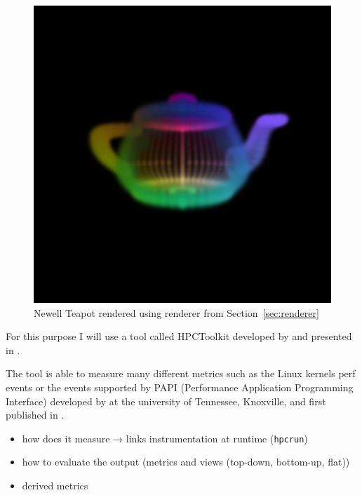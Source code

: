 \documentclass[a4paper, 11pt]{memoir}
\begin{document}
    \begin{figure}[t]
        \centering
        \includegraphics[scale=.2]{images/teapot.png}
        \caption{Newell Teapot rendered using renderer from Section~\ref{sec:renderer}}
        \label{fig:teapot_render}
    \end{figure}
    
    For this purpose I will use a tool called HPCToolkit developed by \citeauthor{hpc_toolkit} and presented in
     \cite{hpc_toolkit}.

    The tool is able to measure many different metrics such as the Linux kernels perf events or the events supported by
    PAPI (Performance Application Programming Interface) developed by \citeauthor{papi} at the university of Tennessee,
    Knoxville, and first published in  \cite{papi}.

    \begin{itemize}
        \item how does it measure →  links instrumentation at runtime (\texttt{hpcrun})
        \item how to evaluate the output (metrics and views (top-down, bottom-up, flat))
        \item derived metrics
    \end{itemize}
\end{document}
